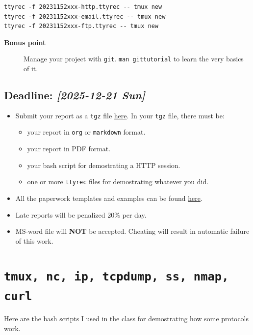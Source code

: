 \documentclass{article}
\begin{document}
\begin{verbatim}
ttyrec -f 20231152xxx-http.ttyrec -- tmux new
ttyrec -f 20231152xxx-email.ttyrec -- tmux new
ttyrec -f 20231152xxx-ftp.ttyrec -- tmux new
\end{verbatim}

\begin{description}
\item[{\textbf{Bonus point}}] Manage your project with \texttt{git}. \texttt{man gittutorial} to
learn the very basics of it.
\end{description}
\subsection{Deadline: \textit{{[}2025-12-21 Sun]}}
\label{sec:orgd0c1114}

\begin{itemize}
\item Submit your report as a \texttt{tgz} file \href{https://cs6.swfu.edu.cn/moodle/mod/assign/view.php?id=885}{here}. In your \texttt{tgz} file, there
must be:

\begin{itemize}
\item your report in \texttt{org} or \texttt{markdown} format.
\item your report in PDF format.
\item your bash script for demostrating a HTTP session.
\item one or more \texttt{ttyrec} files for demostrating whatever you did.
\end{itemize}

\item All the paperwork templates and examples can be found \href{https://cs6.swfu.edu.cn/\~wx672/lecture\_notes/network\_basics/proj-week/}{here}.

\item Late reports will be penalized 20\% per day.

\item MS-word file will \textbf{NOT} be accepted. Cheating will result in automatic failure of this work.
\end{itemize}
\section{\texttt{tmux, nc, ip, tcpdump, ss, nmap, curl}}
\label{sec:org8e594b5}

Here are the bash scripts I used in the class for demostrating how some protocols work.
\end{document}
